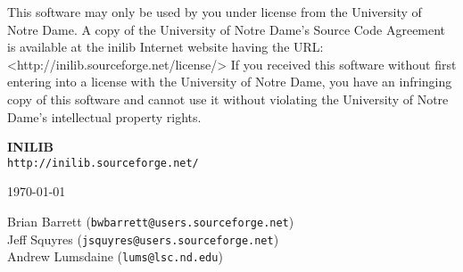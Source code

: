 %
This software may only be used by you under license from the
University of Notre Dame.  A copy of the University of Notre Dame's
Source Code Agreement is available at the inilib Internet website
having the URL: <http://inilib.sourceforge.net/license/> If you
received this software without first entering into a license with the
University of Notre Dame, you have an infringing copy of this software
and cannot use it without violating the University of Notre Dame's
intellectual property rights.
% 
%

\begin{titlepage}

\begin{center}
\vspace*{0.25in}    
{\Large
{\Huge{\bf INILIB \version} \\
\vspace{.25in}
{\tt http://inilib.sourceforge.net/}
}


\vspace{0.9in}

{\huge
\today}

\vspace{0.9in}

Brian Barrett ({\tt bwbarrett@users.sourceforge.net}) \\
Jeff Squyres ({\tt jsquyres@users.sourceforge.net}) \\
Andrew Lumsdaine ({\tt lums@lsc.nd.edu}) \\
}
\end{center}

\end{titlepage}


